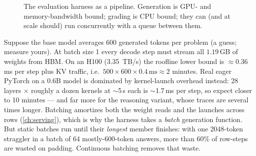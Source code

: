 \begin{figure}[t]
\centering
{}
\caption{The evaluation harness as a pipeline. Generation is GPU- and memory-bandwidth bound;
grading is CPU bound; they can (and at scale should) run concurrently with a queue between them.}
\label{fig:eval:harness}
\end{figure}

\begin{napkinmath}
Suppose the base model averages 600 generated tokens per problem (a guess; measure yours). At
batch size 1 every decode step must stream all $1.19$\,GB of weights from HBM. On an H100
(\SI{3.35}{TB/s}) the roofline lower bound is $\approx 0.36$\,ms per step plus KV traffic, i.e.\
$500 \times 600 \times 0.4\,\text{ms} \approx 2$ minutes. Real eager PyTorch on a 0.6B model is
dominated by kernel-launch overhead instead: 28 layers $\times$ roughly a dozen kernels at
$\sim$5\,\textmu s each is $\sim$1.7\,ms per step, so expect closer to 10 minutes --- and far more
for the reasoning variant, whose traces are several times longer. Batching amortizes both the
weight reads and the launches across rows (\cref{ch:serving}), which is why the harness takes a
\emph{batch} generation function. But static batches run until their \emph{longest} member
finishes: with one 2048-token straggler in a batch of 64 mostly-600-token answers, more than 60\%
of row-steps are wasted on padding. Continuous batching removes that waste.
\end{napkinmath}

